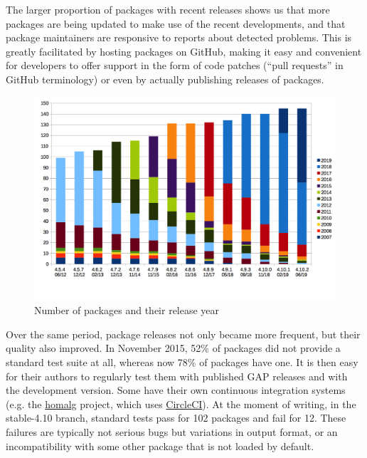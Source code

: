 The larger proportion of packages with recent releases shows us that 
more packages are being updated to make use of the recent \GAP developments,
and that package maintainers are responsive to reports about detected problems.
This is greatly facilitated by hosting packages on GitHub, making it
easy and convenient for \GAP developers to offer support in the form
of code patches (``pull requests'' in GitHub terminology) or even by
actually publishing releases of packages.

\begin{figure}[!ht]
    \centering
    \includegraphics[width=\textwidth]{images/gap-package-releases}
    \caption{Number of \GAP packages and their release year}
    \label{fig:gap-package-releases}
\end{figure}


Over the same period, package releases not only became more frequent,
but their quality also 
improved. In November 2015, 52\% of packages did not provide a standard 
test suite at all, whereas now 78\% of packages have one.
It is then easy for their authors to  regularly test them 
with published GAP releases and with the development version.
Some have their own continuous integration systems
(e.g. the \href{https://homalg-project.github.io/}{\sf homalg} project,
which uses \href{https://circleci.com/}{CircleCI}).
At the moment of writing, in the stable-4.10 branch,
standard tests pass for 102 packages
and fail for 12.
These failures are typically not serious bugs but variations in output
format, or an incompatibility with some other package
that is not loaded by default.

